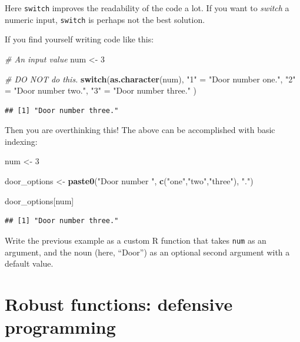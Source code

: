\documentclass[]{book}
\newenvironment{Shaded}{\begin{snugshade}}{\end{snugshade}}
\newcommand{\CommentTok}[1]{\textcolor[rgb]{0.56,0.35,0.01}{\textit{#1}}}
\newcommand{\ControlFlowTok}[1]{\textcolor[rgb]{0.13,0.29,0.53}{\textbf{#1}}}
\newcommand{\DecValTok}[1]{\textcolor[rgb]{0.00,0.00,0.81}{#1}}
\newcommand{\KeywordTok}[1]{\textcolor[rgb]{0.13,0.29,0.53}{\textbf{#1}}}
\newcommand{\NormalTok}[1]{#1}
\newcommand{\StringTok}[1]{\textcolor[rgb]{0.31,0.60,0.02}{#1}}
\let\BeginKnitrBlock\begin \let\EndKnitrBlock\end
\begin{document}
Here \texttt{switch} improves the readability of the code a lot. If you want to \emph{switch} a numeric input, \texttt{switch} is perhaps not the best solution.

If you find yourself writing code like this:

\begin{Shaded}
\begin{Highlighting}[]
\CommentTok{# An input value}
\NormalTok{num <-}\StringTok{ }\DecValTok{3}

\CommentTok{# DO NOT do this.}
\ControlFlowTok{switch}\NormalTok{(}\KeywordTok{as.character}\NormalTok{(num),}
       \StringTok{"1"}\NormalTok{ =}\StringTok{ "Door number one."}\NormalTok{,}
       \StringTok{"2"}\NormalTok{ =}\StringTok{ "Door number two."}\NormalTok{,}
       \StringTok{"3"}\NormalTok{ =}\StringTok{ "Door number three."}
\NormalTok{       )}
\end{Highlighting}
\end{Shaded}

\begin{verbatim}
## [1] "Door number three."
\end{verbatim}

Then you are overthinking this! The above can be accomplished with basic indexing:

\begin{Shaded}
\begin{Highlighting}[]
\NormalTok{num <-}\StringTok{ }\DecValTok{3}

\NormalTok{door_options <-}\StringTok{ }\KeywordTok{paste0}\NormalTok{(}\StringTok{"Door number "}\NormalTok{, }\KeywordTok{c}\NormalTok{(}\StringTok{"one"}\NormalTok{,}\StringTok{"two"}\NormalTok{,}\StringTok{"three"}\NormalTok{), }\StringTok{"."}\NormalTok{)}

\NormalTok{door_options[num]}
\end{Highlighting}
\end{Shaded}

\begin{verbatim}
## [1] "Door number three."
\end{verbatim}

\BeginKnitrBlock{rmdtry}
Write the previous example as a custom R function that takes \texttt{num} as an argument, and the noun (here, ``Door'') as an optional second argument with a default value.
\EndKnitrBlock{rmdtry}

\hypertarget{defensive}{%
\section{Robust functions: defensive programming}\label{defensive}}
\end{document}
